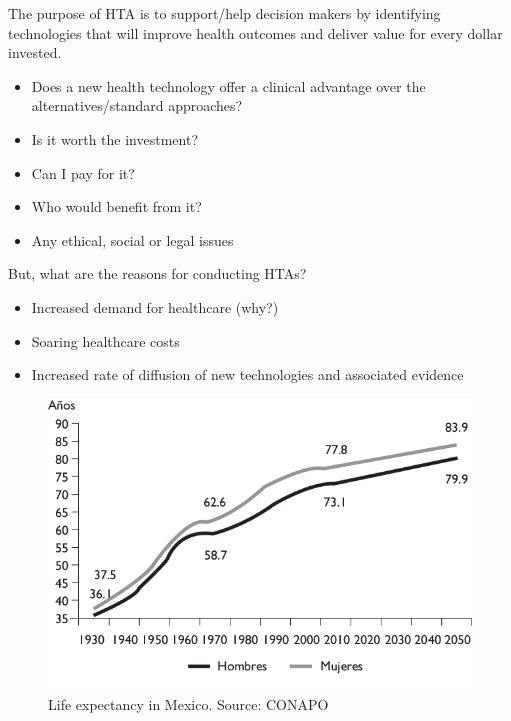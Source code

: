 \documentclass[
]{book}
\providecommand{\tightlist}{%
  \setlength{\itemsep}{0pt}\setlength{\parskip}{0pt}}
\begin{document}
The purpose of HTA is to support/help decision makers by identifying technologies that will improve health outcomes and deliver value for every dollar invested.

\begin{itemize}
\tightlist
\item
  Does a new health technology offer a clinical advantage over the alternatives/standard approaches?
\item
  Is it worth the investment?
\item
  Can I pay for it?
\item
  Who would benefit from it?
\item
  Any ethical, social or legal issues
\end{itemize}

But, what are the reasons for conducting HTAs?

\begin{itemize}
\tightlist
\item
  Increased demand for healthcare (why?)
\item
  Soaring healthcare costs
\item
  Increased rate of diffusion of new technologies and associated evidence
\end{itemize}

\begin{figure}

{\centering \includegraphics[width=8.97in]{images/esperanza} 

}

\caption{Life expectancy in Mexico. Source: CONAPO}\label{fig:expectancy}
\end{figure}
\end{document}

